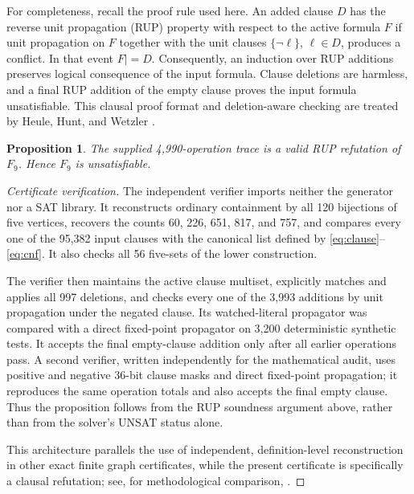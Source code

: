 \documentclass[11pt]{article}
\newtheorem{proposition}[theorem]{Proposition}
\theoremstyle{definition}
\begin{document}
For completeness, recall the proof rule used here.  An added clause \(D\)
has the reverse unit propagation (RUP) property with respect to the active
formula \(F\) if unit propagation on \(F\) together with the unit clauses
\(\{\lnot\ell\}\), \(\ell\in D\), produces a conflict.  In that event
\(F\mathrel{|=}D\).  Consequently, an induction over RUP additions preserves
logical consequence of the input formula.  Clause deletions are harmless,
and a final RUP addition of the empty clause proves the input formula
unsatisfiable.  This clausal proof format and deletion-aware checking are
treated by Heule, Hunt, and Wetzler \cite{HeuleHuntWetzler2013}.

\begin{proposition}\label{prop:rup}
The supplied 4,990-operation trace is a valid RUP refutation of \(F_9\).
Hence \(F_9\) is unsatisfiable.
\end{proposition}

\begin{proof}[Certificate verification]
The independent verifier imports neither the generator nor a SAT library.
It reconstructs ordinary containment by all 120 bijections of five
vertices, recovers the counts 60, 226, 651, 817, and 757, and compares every
one of the 95,382 input clauses with the canonical list defined by
\eqref{eq:clause}--\eqref{eq:cnf}.  It also checks all 56 five-sets of the
lower construction.

The verifier then maintains the active clause multiset, explicitly matches
and applies all 997 deletions, and checks every one of the 3,993 additions by
unit propagation under the negated clause.  Its watched-literal propagator
was compared with a direct fixed-point propagator on 3,200 deterministic
synthetic tests.  It accepts the final empty-clause addition only after all
earlier operations pass.  A second verifier, written independently for the
mathematical audit, uses positive and negative 36-bit clause masks and direct
fixed-point propagation; it reproduces the same operation totals and also
accepts the final empty clause.  Thus the proposition follows from the RUP
soundness argument above, rather than from the solver's UNSAT status alone.

This architecture parallels the use of independent, definition-level
reconstruction in other exact finite graph certificates, while the present
certificate is specifically a clausal refutation; see, for methodological
comparison, \cite{ZengLiuRatnaveluHuat2026}.
\end{proof}
\end{document}
